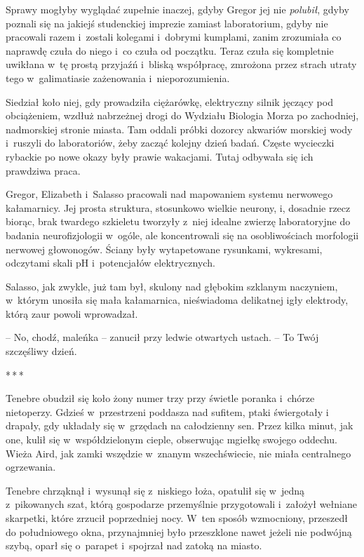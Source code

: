 \documentclass[oneside,polish,12pt,sfheadings]{mwbk}
\newcommand{\threeast}{\bigskip\par\centerline{*\,*\,*}\medskip\par}%
\begin{document}
Sprawy mogłyby wyglądać zupełnie inaczej, gdyby Gregor jej nie
\emph{polubił}, gdyby poznali się na jakiejś studenckiej imprezie
zamiast laboratorium, gdyby nie pracowali razem i~zostali kolegami i~dobrymi kumplami, zanim zrozumiała co naprawdę czuła do niego i~co czuła
od początku. Teraz czuła się kompletnie uwikłana w~tę prostą przyjaźń i~bliską współpracę, zmrożona przez strach utraty tego w~galimatiasie
zażenowania i~nieporozumienia.

Siedział koło niej, gdy prowadziła ciężarówkę, elektryczny silnik
jęczący pod obciążeniem, wzdłuż nabrzeżnej drogi do Wydziału Biologia
Morza po zachodniej, nadmorskiej stronie miasta. Tam oddali próbki
dozorcy akwariów morskiej wody i~ruszyli do laboratoriów, żeby zacząć
kolejny dzień badań. Częste wycieczki rybackie po nowe okazy były prawie
wakacjami. Tutaj odbywała się ich prawdziwa praca.

Gregor, Elizabeth i~Salasso pracowali nad mapowaniem systemu nerwowego
kałamarnicy. Jej prosta struktura, stosunkowo wielkie neurony, i,
dosadnie rzecz biorąc, brak twardego szkieletu tworzyły z~niej idealne
zwierzę laboratoryjne do badania neurofizjologii w~ogóle, ale
koncentrowali się na osobliwościach morfologii nerwowej głowonogów.
Ściany były wytapetowane rysunkami, wykresami, odczytami skali pH i~potencjałów elektrycznych.

Salasso, jak zwykle, już tam był, skulony nad głębokim szklanym
naczyniem, w~którym unosiła się mała kałamarnica, nieświadoma delikatnej
igły elektrody, którą zaur powoli wprowadzał.

-- No, chodź, maleńka -- zanucił przy ledwie otwartych ustach. -- To Twój
szczęśliwy dzień.

\threeast

Tenebre obudził się koło żony numer trzy przy świetle poranka i~chórze
nietoperzy. Gdzieś w~przestrzeni poddasza nad sufitem, ptaki świergotały
i drapały, gdy układały się w~grzędach na całodzienny sen. Przez kilka
minut, jak one, kulił się w~współdzielonym cieple, obserwując mgiełkę
swojego oddechu. Wieża Aird, jak zamki wszędzie w~znanym wszechświecie,
nie miała centralnego ogrzewania.

Tenebre chrząknął i~wysunął się z~niskiego łoża, opatulił się w~jedną z~pikowanych szat, którą gospodarze przemyślnie przygotowali i~założył
wełniane skarpetki, które zrzucił poprzedniej nocy. W~ten sposób
wzmocniony, przeszedł do południowego okna, przynajmniej było
przeszklone nawet jeżeli nie podwójną szybą, oparł się o~parapet i~spojrzał nad zatoką na miasto.
\end{document}
